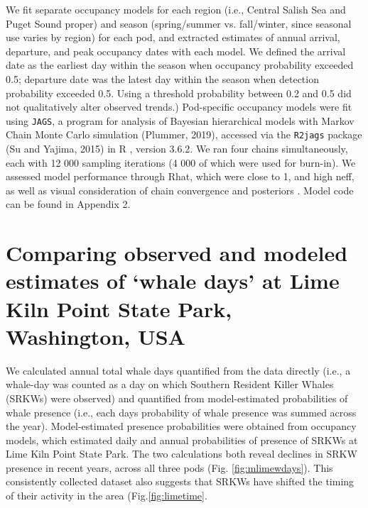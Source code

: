 \documentclass{article}
\begin{document}
 
\par We fit separate occupancy models for each region (i.e., Central Salish Sea and Puget Sound proper) and season (spring/summer vs. fall/winter, since seasonal use varies by region) for each pod, and extracted estimates of annual arrival, departure, and peak occupancy dates with each model. We defined the arrival date as the earliest day within the season when occupancy probability exceeded 0.5; departure date was the latest day within the season when detection probability exceeded 0.5. Using a threshold probability between 0.2 and 0.5 did not qualitatively alter observed trends.) Pod-specific occupancy models were fit using \texttt{JAGS}, a program for analysis of Bayesian hierarchical models with Markov Chain Monte Carlo simulation (Plummer, 2019), accessed via the \texttt{R2jags} package (Su and Yajima, 2015) in R \citep{Rcore2019}, version 3.6.2. We ran four chains simultaneously, each with 12 000 sampling iterations (4 000 of which were used for burn-in). We assessed model performance through Rhat, which were close to 1, and high neff, as well as visual consideration of chain convergence and posteriors \citep{BDA}. Model code can be found in Appendix 2.
 
\section* {Comparing observed and modeled estimates of `whale days' at Lime Kiln Point State Park, Washington, USA}
\par We calculated annual total whale days quantified from the data directly (i.e., a whale-day was counted as a day on which Southern Resident Killer Whales (SRKWs) were observed) and quantified from model-estimated probabilities of whale presence (i.e., each days probability of whale presence was summed across the year). Model-estimated presence probabilities were obtained from occupancy models, which estimated daily and annual probabilities of presence of SRKWs at Lime Kiln Point State Park. The two calculations both reveal declines in SRKW presence in recent years, across all three pods (Fig. \ref{fig:mlimewdays}). This consistently collected dataset also suggests that SRKWs have shifted the timing of their activity in the area (Fig.\ref{fig:limetime}.
\end{document}
